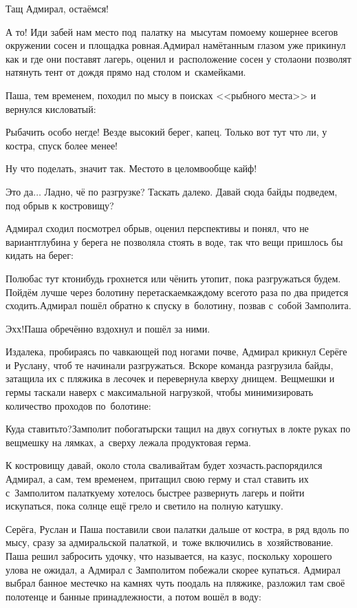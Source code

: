 \diagdash Тащ Адмирал, остаёмся!

\diagdash А то! Иди забей нам место под~палатку на~мысу\mdash там по\sdash моему кошернее всего\mdash в окружении сосен и площадка ровная.\mdash Адмирал намётанным глазом уже прикинул как и где они поставят лагерь, оценил и~расположение сосен у стола\mdash они позволят натянуть тент от дождя прямо над столом и~скамейками. 

Паша, тем временем, походил по мысу в поисках <<рыбного места>> и вернулся кисловатый:

\diagdash Рыбачить особо негде! Везде высокий берег, капец. Только вот тут что ли, у костра, спуск более менее!

\diagdash Ну что поделать, значит так. Место\sdash то в целом\mdash вообще кайф!

\diagdash Это да$\ldots$ Ладно, чё по разгрузке? Таскать далеко. Давай сюда байды подведем, под обрыв к костровищу? 

Адмирал сходил посмотрел обрыв, оценил перспективы и понял, что не вариант\mdash глубина у берега не позволяла стоять в воде, так что вещи пришлось бы кидать на берег:

\diagdash Полюбас тут кто\sdash нибудь грохнется или чё\sdash нить утопит, пока разгружаться будем. Пойдём лучше через болотину перетаскаем\mdash каждому всего\sdash то раза по два придется сходить.\mdash Адмирал пошёл обратно к спуску в~болотину, позвав с~собой Замполита.

\diagdash Эх\sdash х!\mdash Паша обречённо вздохнул и пошёл за ними.

Издалека, пробираясь по чавкающей под ногами почве, Адмирал крикнул Серёге и Руслану, чтоб те начинали разгружаться. Вскоре команда разгрузила байды, затащила их с пляжика в лесочек и перевернула кверху днищем. Вещмешки и гермы таскали наверх с максимальной нагрузкой, чтобы минимизировать количество проходов по~болотине: 

\diagdash Куда ставить\sdash то?\mdash Замполит по\sdash богатырски тащил на двух согнутых в локте руках по вещмешку на лямках, а~сверху лежала продуктовая герма.

\diagdash К костровищу давай, около стола сваливай\mdash там будет хозчасть.\mdash распорядился Адмирал, а сам, тем временем, притащил свою герму и стал ставить их с~Замполитом палатку\mdash ему хотелось быстрее развернуть лагерь и пойти искупаться, пока солнце ещё грело и светило на полную катушку.

Серёга, Руслан и Паша поставили свои палатки дальше от костра, в ряд вдоль по мысу, сразу за адмиральской палаткой, и~тоже включились в~хозяйствование. Паша решил забросить удочку, что называется, на казус, поскольку хорошего улова не ожидал, а Адмирал с Замполитом побежали скорее купаться. Адмирал выбрал банное местечко на камнях чуть поодаль на пляжике, разложил там своё полотенце и банные принадлежности, а потом вошёл в воду: 

